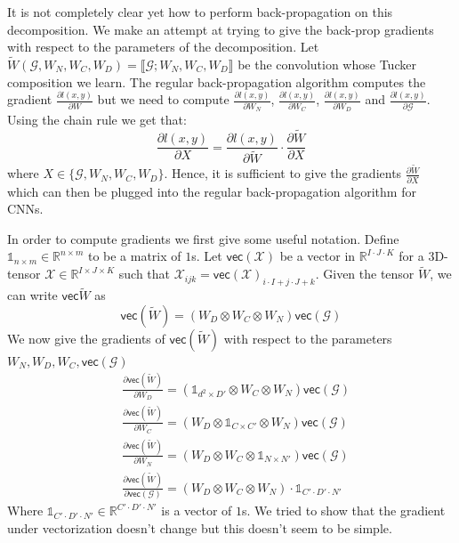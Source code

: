 \documentclass[a4paper]{article}
\newcommand{\R}{\mathbb{R}}
\begin{document}
\begin{multicols*}{2}
It is not completely clear yet how to perform back-propagation on this decomposition. We make an attempt at trying to give the back-prop gradients with respect to the parameters of the decomposition. Let $\tilde{W}(\mathcal{G}, W_N, W_C, W_D) = \llbracket \mathcal{G}; W_N, W_C, W_D \rrbracket$ be the convolution whose Tucker composition we learn. The regular back-propagation algorithm computes the gradient $\frac{\partial l(x, y)}{\partial W}$ but we need to compute $\frac{\partial l(x, y)}{\partial W_N}$, $\frac{\partial l(x, y)}{\partial W_C}$, $\frac{\partial l(x, y)}{\partial W_D}$ and $\frac{\partial l(x, y)}{\partial \mathcal{G}}$. Using the chain rule we get that: 
$$\frac{\partial l(x, y)}{\partial X} = \frac{\partial l(x, y)}{\partial \tilde{W}} \cdot \frac{\partial \tilde{W}}{\partial X} $$ 
where $X \in \{\mathcal{G}, W_N, W_C, W_D\}$. Hence, it is sufficient to give the gradients $\frac{\partial \tilde{W}}{\partial X}$ which can then be plugged into the regular back-propagation algorithm for CNNs. 

In order to compute gradients we first give some useful notation. Define $\mathds{1}_{n \times m} \in \R^{n \times m}$ to be a matrix of $1$s. Let $\mathsf{vec}(\mathcal{X})$ be a vector in $\R^{I\cdot J \cdot K}$ for a 3D-tensor $\mathcal{X} \in \R^{I \times J \times K}$ such that $\mathcal{X}_{ijk} = \mathsf{vec}(\mathcal{X})_{i \cdot I + j \cdot J + k}$. Given the tensor $\tilde{W}$, we can write $\mathsf{vec}{\tilde{W}}$ as 
$$\mathsf{vec}(\tilde{W}) = (W_D \otimes W_C \otimes W_N)\mathsf{vec}(\mathcal{G}) $$ 
We now give the gradients of $\mathsf{vec}(\tilde{W})$ with respect to the parameters $W_N, W_D, W_C, \mathsf{vec}(\mathcal{G})$
\begin{align*}
&\frac{\partial \mathsf{vec}(\tilde{W})}{\partial W_D} = (\mathds{1}_{d^2 \times D'} \otimes W_C \otimes W_N)\mathsf{vec}(\mathcal{G}) \\
&\frac{\partial \mathsf{vec}(\tilde{W})}{\partial W_C} = (W_D \otimes \mathds{1}_{C \times C'} \otimes W_N)\mathsf{vec}(\mathcal{G}) \\ 
&\frac{\partial \mathsf{vec}(\tilde{W})}{\partial W_N} = (W_D \otimes W_C \otimes \mathds{1}_{N \times N'})\mathsf{vec}(\mathcal{G}) \\
&\frac{\partial \mathsf{vec}(\tilde{W})}{\partial \mathsf{vec}(\mathcal{G})} = (W_D \otimes W_C \otimes W_N) \cdot \mathds{1}_{C'\cdot D' \cdot N'}
\end{align*}
Where $\mathds{1}_{C'\cdot D' \cdot N'} \in \R^{C'\cdot D' \cdot N'}$ is a vector of $1$s. We tried to show that the gradient under vectorization doesn't change but this doesn't seem to be simple.   


\end{multicols*}
\end{document}
